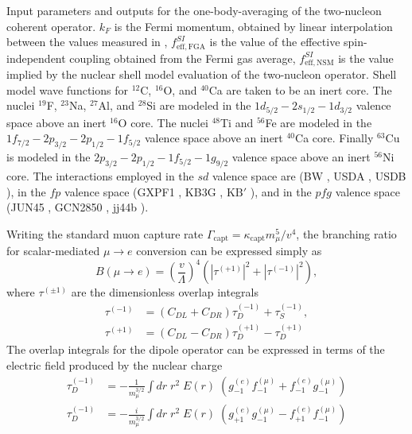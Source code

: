 \documentclass{book}[letterpaper,12pt]
\begin{document}
\begin{table}
\caption{Input parameters and outputs for the one-body-averaging of the two-nucleon coherent operator. $k_F$ is the Fermi momentum, obtained by linear interpolation between the values measured in \cite{PhysRevLett.26.445}, $f^{SI}_\mathrm{eff,FGA}$ is the value of the effective spin-independent coupling obtained from the Fermi gas average, $f^{SI}_\mathrm{eff,NSM}$ is the value implied by the nuclear shell model evaluation of the two-nucleon operator. Shell model wave functions for $^{12}$C, $^{16}$O, and $^{40}$Ca are taken to be an inert core. The nuclei $^{19}$F, $^{23}$Na, $^{27}$Al, and $^{28}$Si are modeled in the $1d_{5/2}-2s_{1/2}-1d_{3/2}$ valence space above an inert $^{16}$O core. The nuclei $^{48}$Ti and $^{56}$Fe are modeled in the $1f_{7/2}-2p_{3/2}-2p_{1/2}-1f_{5/2}$ valence space above an inert $^{40}$Ca core. Finally $^{63}$Cu is modeled in the $2p_{3/2}-2p_{1/2}-1f_{5/2}-1g_{9/2}$ valence space above an inert $^{56}$Ni core. The interactions employed in the $sd$ valence space are (BW \cite{bw}, USDA \cite{PhysRevC.74.034315}, USDB \cite{PhysRevC.74.034315}), in the $fp$ valence space (GXPF1 \cite{gxpf1}, KB3G \cite{kb3g}, $\mathrm{KB}'$ \cite{kbp}), and in the $pfg$ valence space (JUN45 \cite{jun45}, GCN2850 \cite{gcn2850}, jj44b \cite{jj44b}).}
\label{tab:two_body}
\end{table}
Writing the standard muon capture rate $\Gamma_\mathrm{capt}=\kappa_\mathrm{capt}m_{\mu}^5/v^4$, the branching ratio for scalar-mediated $\mu\rightarrow e$ conversion can be expressed simply as 
\begin{equation}
B(\mu\rightarrow e)=\left(\frac{v}{\Lambda}\right)^4\left(\left|\tau^{(+1)}\right|^2+\left|\tau^{(-1)}\right|^2\right),
\end{equation}
where $\tau^{(\pm 1)}$ are the dimensionless overlap integrals
\begin{equation}
\begin{split}
\tau^{(-1)}&=\left(C_{DL}+C_{DR}\right)\tau^{(-1)}_D+\tau_S^{(-1)},\\
\tau^{(+1)}&=\left(C_{DL}-C_{DR}\right)\tau_D^{(+1)}-\tau_D^{(+1)}
\end{split}
\end{equation}
The overlap integrals for the dipole operator can be expressed in terms of the electric field produced by the nuclear charge
\begin{equation}
\begin{split}
\tau_D^{(-1)}&=-\frac{1}{m_{\mu}^{3/2}}\int dr\;r^2\;E(r)\;\left(g_{-1}^{(e)}f_{-1}^{(\mu)}+f_{-1}^{(e)}g_{-1}^{(\mu)}\right)\\
\tau_D^{(-1)}&=-\frac{i}{m_{\mu}^{3/2}}\int dr\;r^2\;E(r)\;\left(g_{+1}^{(e)}g_{-1}^{(\mu)}-f_{+1}^{(e)}f_{-1}^{(\mu)}\right)
\end{split}
\end{equation}
\end{document}
